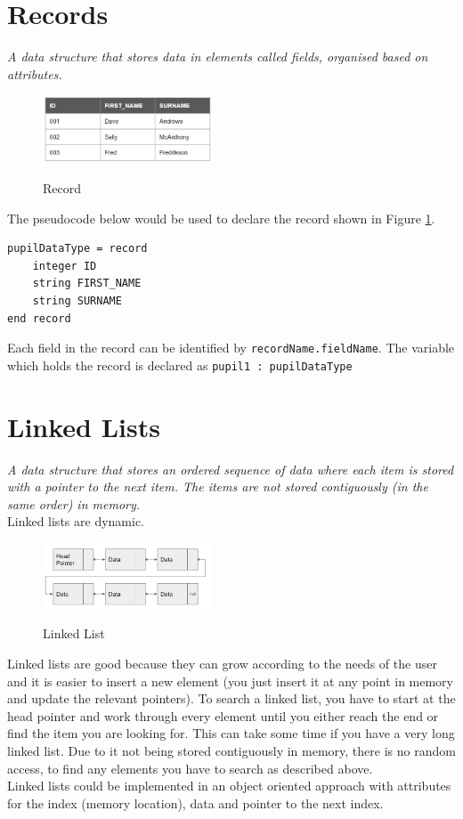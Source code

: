 \documentclass[a4paper,11pt, twocolumn]{article}
\begin{document}
\section{Records}
\textit{A data structure that stores data in elements called fields, organised based on attributes.}\\
\begin{figure}[H]
    \centering
    \includegraphics[width=0.45\textwidth]{record.jpg}
    \label{fig:record}
    \caption{Record}
\end{figure}
\noindent The pseudocode below would be used to declare the record shown in Figure \ref{fig:record}.
\begin{Verbatim}[breaklines=true, breakanywhere=true]
    pupilDataType = record
    integer ID
    string FIRST_NAME
    string SURNAME
end record
\end{Verbatim}
Each field in the record can be identified by \verb|recordName.fieldName|. The variable which holds the record is declared as \verb|pupil1 : pupilDataType|

\section{Linked Lists}
\textit{A data structure that stores an ordered sequence of data where each item is stored with a pointer to the next item. The items are not stored contiguously (in the same order) in memory.}\\
Linked lists are dynamic.
\begin{figure}[H]
    \centering
    \includegraphics[width=0.45\textwidth]{linkedList.jpg}
    \label{fig:linkedList}
    \caption{Linked List}
\end{figure}
\noindent Linked lists are good because they can grow according to the needs of the user and it is easier to insert a new element (you just insert it at any point in memory and update the relevant pointers). To search a linked list, you have to start at the head pointer and work through every element until you either reach the end or find the item you are looking for. This can take some time if you have a very long linked list. Due to it not being stored contiguously in memory, there is no random access, to find any elements you have to search as described above.\\
Linked lists could be implemented in an object oriented approach with attributes for the index (memory location), data and pointer to the next index.
\end{document}
